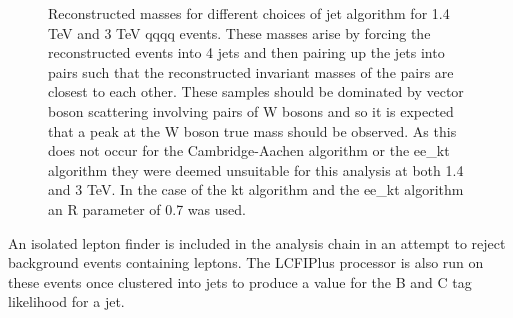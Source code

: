 \begin{figure}
\centering
{}
\caption[Reconstructed invariant masses for different choices of jet algorithm for 1.4 TeV and 3 TeV \nu{\nu}qqqq events.]{Reconstructed masses for different choices of jet algorithm for 1.4 TeV and 3 TeV \nu{\nu}qqqq events. These masses arise by forcing the reconstructed events into 4 jets and then pairing up the jets into pairs such that the reconstructed invariant masses of the pairs are closest to each other. These samples should be dominated by vector boson scattering involving pairs of W bosons and so it is expected that a peak at the W boson true mass should be observed. As this does not occur for the Cambridge-Aachen algorithm or the ee\_kt algorithm they were deemed unsuitable for this analysis at both 1.4 and 3 TeV. In the case of the kt algorithm and the ee\_kt algorithm an R parameter of 0.7 was used.}
\label{fig:eventweights1400raw}
\end{figure}

An isolated lepton finder is included in the analysis chain in an attempt to reject background events containing leptons. The LCFIPlus \cite{Suehara:2015ura} processor is also run on these events once clustered into jets to produce a value for the B and C tag likelihood for a jet.  

